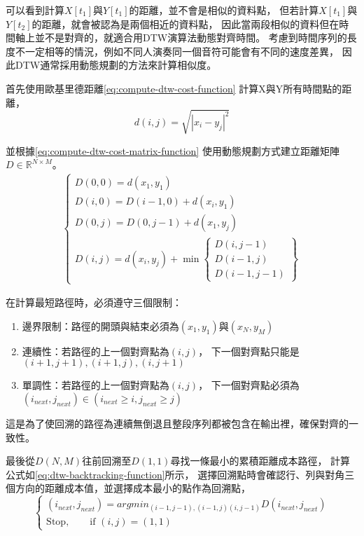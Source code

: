 \documentclass[class=NCU_thesis, crop=false]{standalone}
\begin{document}
可以看到計算$X[t_1]$與$Y[t_1]$的距離，並不會是相似的資料點，
但若計算$X[t_1]$與$Y[t_2]$的距離，就會被認為是兩個相近的資料點，
因此當兩段相似的資料但在時間軸上並不是對齊的，就適合用DTW演算法動態對齊時間。
考慮到時間序列的長度不一定相等的情況，例如不同人演奏同一個音符可能會有不同的速度差異，
因此DTW通常採用動態規劃的方法來計算相似度。

首先使用歐基里德距離\cref{eq:compute-dtw-cost-function}
計算X與Y所有時間點的距離，
\begin{equation}
    \label{eq:compute-dtw-cost-function}
    d(i, j) = \sqrt{\left\lvert x_i-y_j\right\rvert^{2}}
\end{equation}

並根據\cref{eq:compute-dtw-cost-matrix-function}
使用動態規劃方式建立距離矩陣$D \in \mathbb{R}^{N \times M}$。
\begin{align}
    \label{eq:compute-dtw-cost-matrix-function}
    \left\{
        \begin{array}{l}
            D(0, 0) = d(x_1, y_1)\\
            D(i, 0) = D(i-1, 0)+d(x_i, y_1)\\
            D(0, j) = D(0, j-1)+d(x_1, y_j)\\
            D(i, j) = d(x_i, y_j) + \min \left\{
                \begin{array}{l}
                    D(i, j-1) \\
                    D(i-1, j) \\
                    D(i-1, j-1)
                \end{array}\right\}
        \end{array}
    \right.
\end{align}

在計算最短路徑時，必須遵守三個限制：
\begin{enumerate}
    \item 邊界限制：路徑的開頭與結束必須為$(x_1,y_1)$與$(x_N,y_M)$
    \item 連續性：若路徑的上一個對齊點為$(i, j)$， 
    下一個對齊點只能是$(i+1, j+1), (i+1, j), (i, j+1)$
    \item 單調性：若路徑的上一個對齊點為$(i, j)$，
    下一個對齊點必須為$(i_{next}, j_{next}) \in (i_{next} \geq i, j_{next} \geq j)$
\end{enumerate}
這是為了使回溯的路徑為連續無倒退且整段序列都被包含在輸出裡，確保對齊的一致性。

最後從$D(N, M)$往前回溯至$D(1, 1)$尋找一條最小的累積距離成本路徑，
計算公式如\cref{eq:dtw-backtracking-function}所示，
選擇回溯點時會確認行、列與對角三個方向的距離成本值，並選擇成本最小的點作為回溯點，
\begin{equation} 
    \label{eq:dtw-backtracking-function}
    \begin{cases}
        \text{$(i_{next}, j_{next}) = argmin_{(i-1,j-1),(i-1,j)(i,j-1)}D(i_{next}, j_{next})$} \\
        \text{Stop},\qquad \text{if $(i, j) = (1, 1)$} 
    \end{cases}
\end{equation}
\end{document}
